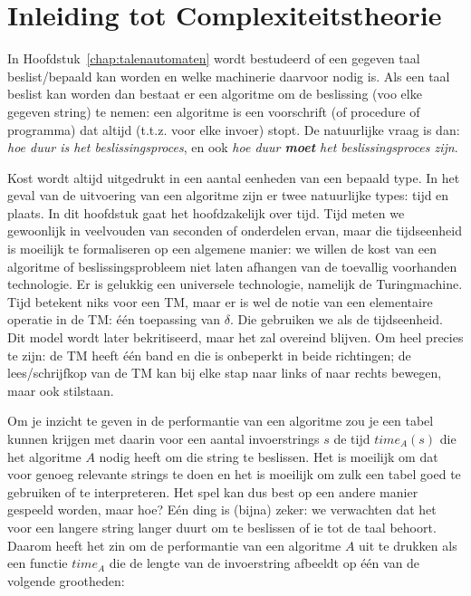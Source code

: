 
\chapter{Inleiding tot Complexiteitstheorie}

In Hoofdstuk~\ref{chap:talenautomaten} wordt bestudeerd of een gegeven
taal beslist/bepaald kan worden en welke machinerie daarvoor nodig
is. Als een taal beslist kan worden dan bestaat er een algoritme om de
beslissing (voo elke gegeven string) te nemen: een algoritme is
een voorschrift (of procedure of programma) dat altijd (t.t.z. voor
elke invoer) stopt. De natuurlijke vraag is dan: {\em hoe duur is het
  beslissingsproces}, en ook {\em hoe duur {\bf moet} het
  beslissingsproces zijn}.

Kost wordt altijd uitgedrukt in een aantal eenheden van een bepaald
type. In het geval van de uitvoering van een algoritme zijn er twee
natuurlijke types: tijd en plaats. In dit hoofdstuk gaat het
hoofdzakelijk over tijd. Tijd meten we gewoonlijk in veelvouden van
seconden of onderdelen ervan, maar die tijdseenheid is moeilijk te
formaliseren op een algemene manier: we willen de kost van een
algoritme of beslissingsprobleem niet laten afhangen van de toevallig
voorhanden technologie. Er is gelukkig een universele technologie,
namelijk de Turingmachine. Tijd betekent niks voor een TM, maar er
is wel de notie van een elementaire operatie in de TM: \'{e}\'{e}n
toepassing van $\delta$. Die gebruiken we als de tijdseenheid. Dit
model wordt later bekritiseerd, maar het zal overeind blijven. Om heel
precies te zijn: de TM heeft \'{e}\'{e}n band en die is onbeperkt in
beide richtingen; de lees/schrijfkop van de TM kan bij elke stap
naar links of naar rechts bewegen, maar ook stilstaan.

Om je inzicht te geven in de performantie van een algoritme zou je een
tabel kunnen krijgen met daarin voor een aantal invoerstrings $s$ de
tijd $time_A(s)$ die het algoritme $A$ nodig heeft om die string te
beslissen. Het is moeilijk om dat voor genoeg relevante strings te
doen en het is moeilijk om zulk een tabel goed te gebruiken of te
interpreteren. Het spel kan dus best op een andere manier gespeeld
worden, maar hoe? E\'{e}n ding is (bijna) zeker: we verwachten dat
het voor een langere string langer duurt om te beslissen of ie tot de
taal behoort. Daarom heeft het zin om de performantie van een
algoritme $A$ uit te drukken als een functie $time_A$ die de lengte
van de invoerstring afbeeldt op \'{e}\'{e}n van de volgende
grootheden:

